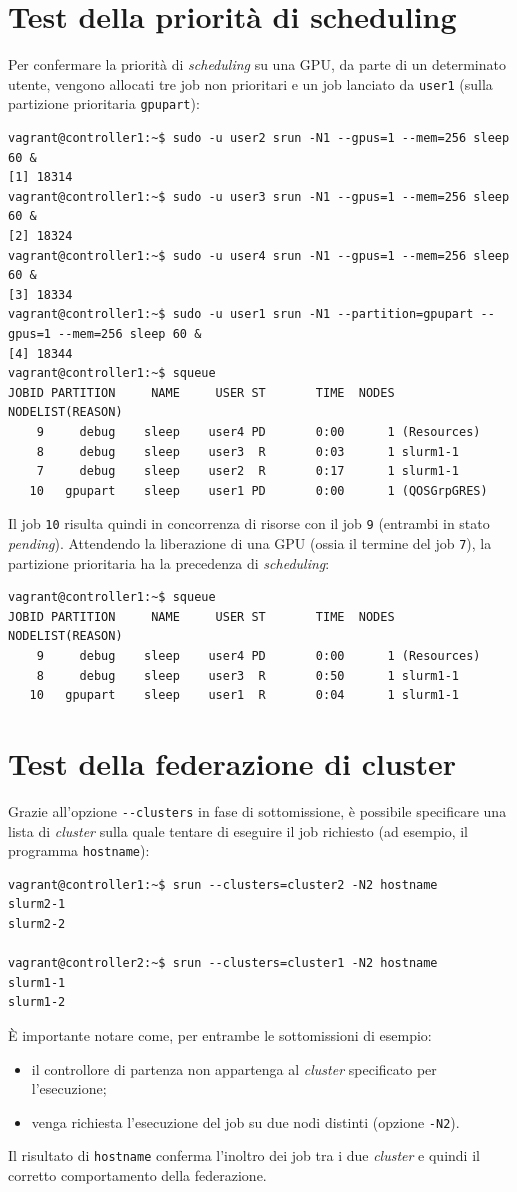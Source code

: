 \documentclass[12pt,a4paper,twoside,openright]{book}
\begin{document}
\section{Test della priorità di scheduling}
Per confermare la priorità di \textit{scheduling} su una \ac{GPU}, da parte di un determinato utente, vengono allocati tre job non prioritari e un job lanciato da \texttt{user1} (sulla partizione prioritaria \texttt{gpupart}):
\begin{verbatim}
vagrant@controller1:~$ sudo -u user2 srun -N1 --gpus=1 --mem=256 sleep 60 &
[1] 18314
vagrant@controller1:~$ sudo -u user3 srun -N1 --gpus=1 --mem=256 sleep 60 &
[2] 18324
vagrant@controller1:~$ sudo -u user4 srun -N1 --gpus=1 --mem=256 sleep 60 &
[3] 18334
vagrant@controller1:~$ sudo -u user1 srun -N1 --partition=gpupart --gpus=1 --mem=256 sleep 60 &
[4] 18344
vagrant@controller1:~$ squeue
JOBID PARTITION     NAME     USER ST       TIME  NODES NODELIST(REASON)
    9     debug    sleep    user4 PD       0:00      1 (Resources)
    8     debug    sleep    user3  R       0:03      1 slurm1-1
    7     debug    sleep    user2  R       0:17      1 slurm1-1
   10   gpupart    sleep    user1 PD       0:00      1 (QOSGrpGRES)
\end{verbatim}
Il job \texttt{10} risulta quindi in concorrenza di risorse con il job \texttt{9} (entrambi in stato \textit{pending}). Attendendo la liberazione di una \ac{GPU} (ossia il termine del job \texttt{7}), la partizione prioritaria ha la precedenza di \textit{scheduling}:
\begin{verbatim}
vagrant@controller1:~$ squeue
JOBID PARTITION     NAME     USER ST       TIME  NODES NODELIST(REASON)
    9     debug    sleep    user4 PD       0:00      1 (Resources)
    8     debug    sleep    user3  R       0:50      1 slurm1-1
   10   gpupart    sleep    user1  R       0:04      1 slurm1-1
\end{verbatim}

\section{Test della federazione di cluster}
Grazie all'opzione \texttt{{-}{-}clusters} in fase di sottomissione, è possibile specificare una lista di \textit{cluster} sulla quale tentare di eseguire il job richiesto (ad esempio, il programma \texttt{hostname}):
\begin{verbatim}
vagrant@controller1:~$ srun --clusters=cluster2 -N2 hostname
slurm2-1
slurm2-2

vagrant@controller2:~$ srun --clusters=cluster1 -N2 hostname
slurm1-1
slurm1-2
\end{verbatim}
È importante notare come, per entrambe le sottomissioni di esempio:
\begin{itemize}
    \item il controllore di partenza non appartenga al \textit{cluster} specificato per l'esecuzione;
    \item venga richiesta l'esecuzione del job su due nodi distinti (opzione \texttt{-N2}).
\end{itemize}
Il risultato di \texttt{hostname} conferma l'inoltro dei job tra i due \textit{cluster} e quindi il corretto comportamento della federazione.
\end{document}
